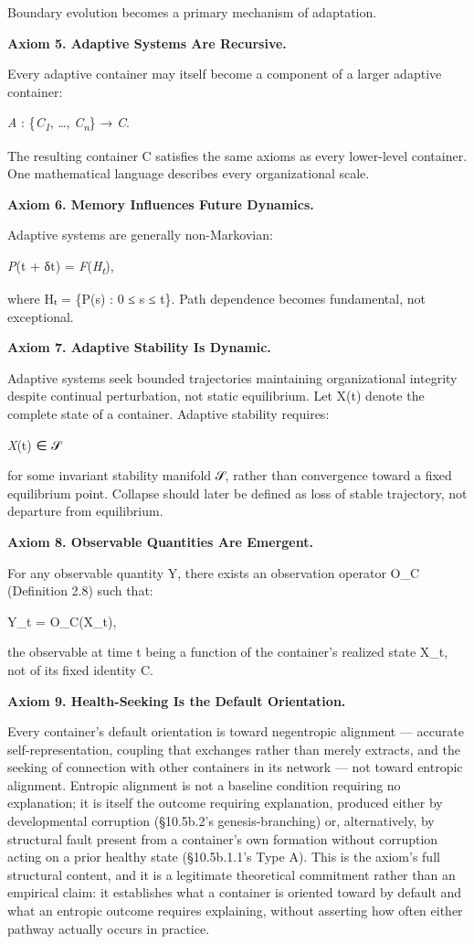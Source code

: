 \documentclass[
]{article}
\begin{document}
Boundary evolution becomes a primary mechanism of adaptation.

\textbf{Axiom 5. Adaptive Systems Are Recursive.}

Every adaptive container may itself become a component of a larger
adaptive container:

\emph{A} : \{\emph{C\textsubscript{1}}, \ldots,
\emph{C\textsubscript{n}}\} → \emph{C}.

The resulting container C satisfies the same axioms as every lower-level
container. One mathematical language describes every organizational
scale.

\textbf{Axiom 6. Memory Influences Future Dynamics.}

Adaptive systems are generally non-Markovian:

\emph{P}(t + δt) = \emph{F}(\emph{H\textsubscript{t}}),

where Hₜ = \{P(s) : 0 ≤ s ≤ t\}. Path dependence becomes fundamental,
not exceptional.

\textbf{Axiom 7. Adaptive Stability Is Dynamic.}

Adaptive systems seek bounded trajectories maintaining organizational
integrity despite continual perturbation, not static equilibrium. Let
X(t) denote the complete state of a container. Adaptive stability
requires:

\emph{X}(t) ∈ 𝒮

for some invariant stability manifold 𝒮, rather than convergence toward
a fixed equilibrium point. Collapse should later be defined as loss of
stable trajectory, not departure from equilibrium.

\textbf{Axiom 8. Observable Quantities Are Emergent.}

For any observable quantity Y, there exists an observation operator O\_C
(Definition 2.8) such that:

Y\_t = O\_C(X\_t),

the observable at time t being a function of the container's realized
state X\_t, not of its fixed identity C.

\textbf{Axiom 9. Health-Seeking Is the Default Orientation.}

Every container's default orientation is toward negentropic alignment
--- accurate self-representation, coupling that exchanges rather than
merely extracts, and the seeking of connection with other containers in
its network --- not toward entropic alignment. Entropic alignment is not
a baseline condition requiring no explanation; it is itself the outcome
requiring explanation, produced either by developmental corruption
(§10.5b.2's genesis-branching) or, alternatively, by structural fault
present from a container's own formation without corruption acting on a
prior healthy state (§10.5b.1.1's Type A). This is the axiom's full
structural content, and it is a legitimate theoretical commitment rather
than an empirical claim: it establishes what a container is oriented
toward by default and what an entropic outcome requires explaining,
without asserting how often either pathway actually occurs in practice.
\end{document}
